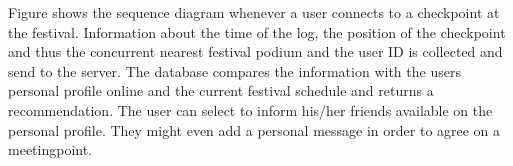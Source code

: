 %

Figure %
shows the sequence diagram whenever a user connects to a checkpoint at the festival. Information about the time of the log, the position of the checkpoint and thus the concurrent nearest festival podium and the user ID is collected and send to the server. The database compares the information with the users personal profile online and the current festival schedule and returns a recommendation. The user can select to inform his/her friends available on the personal profile. They might even add a personal message in order to agree on a meetingpoint. 

%

